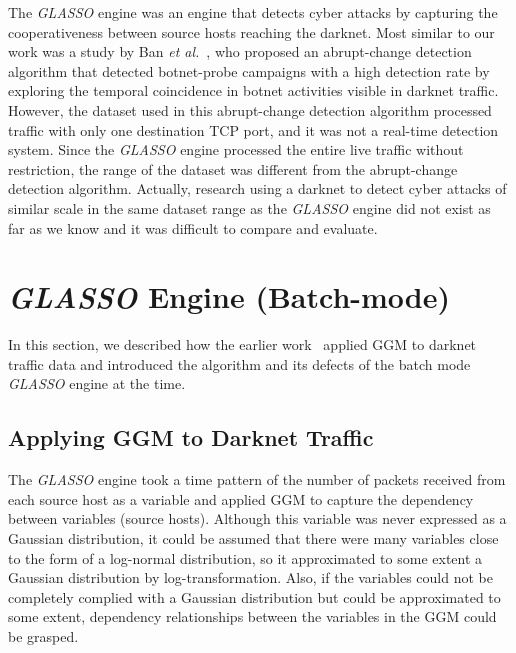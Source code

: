 \documentclass[conference]{IEEEtran}
\begin{document}
The {\it GLASSO} engine was an engine that detects cyber attacks by capturing the cooperativeness between source hosts reaching the darknet.
Most similar to our work was a study by Ban {\it et al.}~\cite{Ban}, who proposed an abrupt-change detection algorithm that detected botnet-probe campaigns with a high detection rate by exploring the temporal coincidence in botnet activities visible in darknet traffic.
However, the dataset used in this abrupt-change detection algorithm processed traffic with only one destination TCP port, and it was not a real-time detection system.
Since the {\it GLASSO} engine processed the entire live traffic without restriction, the range of the dataset was different from the abrupt-change detection algorithm.
Actually, research using a darknet to detect cyber attacks of similar scale in the same dataset range as the {\it GLASSO} engine did not exist as far as we know and it was difficult to compare and evaluate.




\section{{\it GLASSO} Engine (Batch-mode)}
In this section, we described how the earlier work~\cite{Han} applied GGM to darknet traffic data and introduced the algorithm and its defects of the batch mode {\it GLASSO} engine at the time.


\subsection{Applying GGM to Darknet Traffic}
The {\it GLASSO} engine took a time pattern of the number of packets received from each source host as a variable and applied GGM to capture the dependency between variables (source hosts).
Although this variable was never expressed as a Gaussian distribution, it could be assumed that there were many variables close to the form of a log-normal distribution, so it approximated to some extent a Gaussian distribution by log-transformation.
Also, if the variables could not be completely complied with a Gaussian distribution but could be approximated to some extent, dependency relationships between the variables in the GGM could be grasped.
\end{document}

